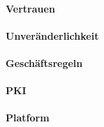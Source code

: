 \paragraph{Vertrauen}

\paragraph{Unveränderlichkeit}

\paragraph{Geschäftsregeln}

\paragraph{PKI}

\paragraph{Platform}


\newpage
